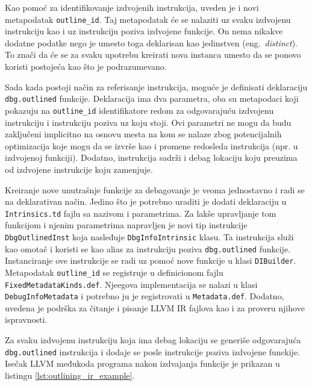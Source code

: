 \documentclass[12pt,oneside]{memoir}
\begin{document}
Kao pomoć za identifikovanje izdvojenih instrukcija, uveden je i novi metapodatak \verb|outline_id|.
Taj metapodatak će se nalaziti uz svaku izdvojenu instrukciju kao i uz instrukciju poziva izdvojene funkcije.
On nema nikakve dodatne podatke nego je umesto toga deklarisan kao jedinstven (eng.~{\em distinct}).
To znači da će se za svaku upotrebu kreirati nova instanca umesto da se ponovo koristi postojeća kao što je podrazumevano.

Sada kada postoji način za referisanje instrukcija, moguće je definisati deklaraciju \verb|dbg.outlined| funkcije.
Deklaracija ima dva parametra, oba su metapodaci koji pokazuju na \verb|outline_id| identifikatore redom za odgovarajuću izdvojenu instrukciju i instrukciju poziva uz koju stoji.
Ovi parametri ne mogu da budu zaključeni implicitno na osnovu mesta na kom se nalaze zbog potencijalnih optimizacija koje mogu da se izvrše kao i promene redosleda instrukcija (npr. u izdvojenoj funkciji).
Dodatno, instrukcija sadrži i debag lokaciju koju preuzima od izdvojene instrukcije koju zamenjuje.

Kreiranje nove unutrašnje funkcije za debagovanje je veoma jednostavno i radi se na deklarativan način.
Jedino što je potrebno uraditi je dodati deklaraciju u \verb|Intrinsics.td| fajlu sa nazivom i parametrima.
Za lakše upravljanje tom funkcijom i njenim parametrima napravljen je novi tip instrukcije \verb|DbgOutlinedInst| koja nasleđuje \verb|DbgInfoIntrinsic| klasu.
Ta instrukcija služi kao omotač i koristi se kao alias za instrukciju poziva \verb|dbg.outlined| funkcije. 
Instanciranje ove instrukcije se radi uz pomoć nove funkcije u klasi \verb|DIBuilder|.
Metapodatak \verb|outline_id| se registruje u definicionom fajlu \verb|FixedMetadataKinds.def|.
Njeegova implementacija se nalazi u klasi \verb|DebugInfoMetadata| i potrebno ju je registrovati u \verb|Metadata.def|.
Dodatno, uvedena je podrška za čitanje i pisanje LLVM IR fajlova kao i za proveru njihove ispravnosti.

Za svaku izdvojenu instrukciju koja ima debag lokaciju se generiše odgovarajuća \verb|dbg.outlined| instrukcija i dodaje se posle instrukcije poziva izdvojene funckije.
Isečak LLVM međukoda programa nakon izdvajanja funkcije je prikazan u listingu \ref{lst:outlining_ir_example}.
\end{document}
